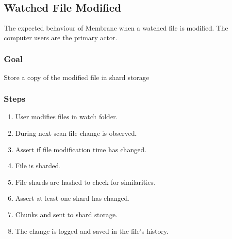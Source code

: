 \documentclass[11pt, a4paper, twocolumn, twoside]{report}
\begin{document}
\subsection{Watched File Modified}
The expected behaviour of Membrane when a watched file is modified. The computer users are the primary actor.

\subsubsection{Goal}

Store a copy of the modified file in shard storage

\subsubsection{Steps}

\begin{enumerate}
 \item User modifies files in watch folder.
 \item During next scan file change is observed.
 \item Assert if file modification time has changed.
 \item File is sharded.
 \item File shards are hashed to check for similarities.
 \item Assert at least one shard has changed.
 \item Chunks and sent to shard storage.
 \item The change is logged and saved in the file's history.
\end{enumerate}
\end{document}
